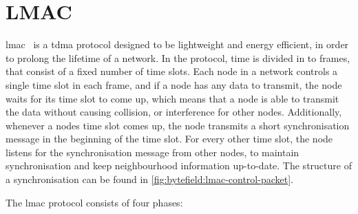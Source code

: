 \section{LMAC}\label{sec:lmacc}
\gls{lmac}~\cite{paper:lmac_protocol}\cite{paper:lmac_verification} is a \gls{tdma} protocol designed to be
lightweight and energy efficient, in order to prolong the lifetime of a network. In the protocol, time is
divided in to frames, that consist of a fixed number of time slots. Each node in a network controls a single
time slot in each frame, and if a node has any data to transmit, the node waits for its time slot to come up,
which means that a node is able to transmit the data without causing collision, or interference for other
nodes. Additionally, whenever a nodes time slot comes up, the node transmits a short synchronisation message
in the beginning of the time slot. For every other time slot, the node listens for the synchronisation message
from other nodes, to maintain synchronisation and keep neighbourhood information up-to-date. The structure of
a synchronisation can be found in \autoref{fig:bytefield:lmac-control-packet}. \medbreak

The \gls{lmac} protocol consists of four phases:


